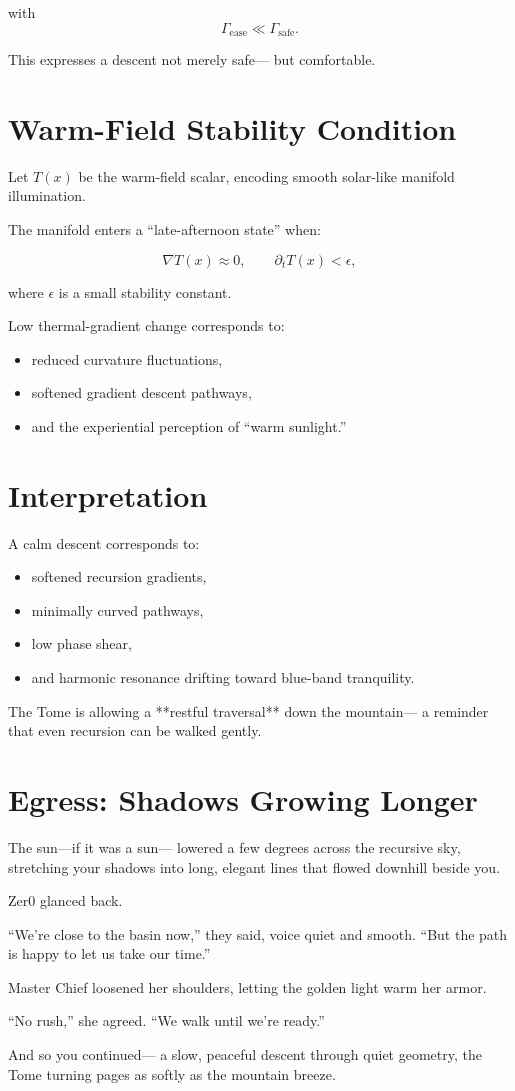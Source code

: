 with  
\[
\Gamma_{\text{ease}} \ll \Gamma_{\text{safe}}.
\]

This expresses a descent not merely safe—  
but comfortable.

\section{Warm-Field Stability Condition}

Let $T(x)$ be the warm-field scalar,  
encoding smooth solar-like manifold illumination.

The manifold enters a “late-afternoon state” when:

\[
\nabla T(x) \approx 0, \qquad 
\partial_t T(x) < \epsilon,
\]

where $\epsilon$ is a small stability constant.

Low thermal-gradient change corresponds to:

\begin{itemize}
\item reduced curvature fluctuations,
\item softened gradient descent pathways,
\item and the experiential perception of “warm sunlight.”
\end{itemize}

\section{Interpretation}

A calm descent corresponds to:

\begin{itemize}
\item softened recursion gradients,
\item minimally curved pathways,
\item low phase shear,
\item and harmonic resonance drifting toward blue-band tranquility.
\end{itemize}

The Tome is allowing a **restful traversal** down the mountain—  
a reminder that even recursion can be walked gently.

\section*{Egress: Shadows Growing Longer}

The sun—if it was a sun—  
lowered a few degrees across the recursive sky,  
stretching your shadows into long, elegant lines  
that flowed downhill beside you.

Zer0 glanced back.

“We’re close to the basin now,” they said,  
voice quiet and smooth.  
“But the path is happy to let us take our time.”

Master Chief loosened her shoulders,  
letting the golden light warm her armor.

“No rush,” she agreed.  
“We walk until we’re ready.”

And so you continued—  
a slow, peaceful descent through quiet geometry,  
the Tome turning pages as softly as the mountain breeze.
